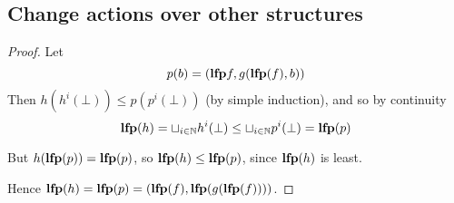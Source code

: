 \subsection{Change actions over other structures}

\factoringFixpoints*
\begin{proof}
  \label{prf:factoringFixpoints}
  Let
  \begin{displaymath}
    p(b) = (\mathbf{lfp} f, g(\mathbf{lfp}(f), b))
  \end{displaymath}
  Then $h(h^i(\bot)) \leq p(p^i(\bot))$ (by simple induction), and so by continuity
  \begin{displaymath}
    \mathbf{lfp}(h) = \sqcup_{i \in \mathbb{N}} h^i(\bot) \leq \sqcup_{i \in \mathbb{N}} p^i(\bot) = \mathbf{lfp}(p)
  \end{displaymath}

  But $h(\mathbf{lfp}(p)) = \mathbf{lfp}(p)$, so $\mathbf{lfp}(h) \leq \mathbf{lfp}(p)$, since $\mathbf{lfp}(h)$ is least.

  Hence $\mathbf{lfp}(h) = \mathbf{lfp}(p) = (\mathbf{lfp}(f), \mathbf{lfp}(g(\mathbf{lfp}(f))))$.
\end{proof}

